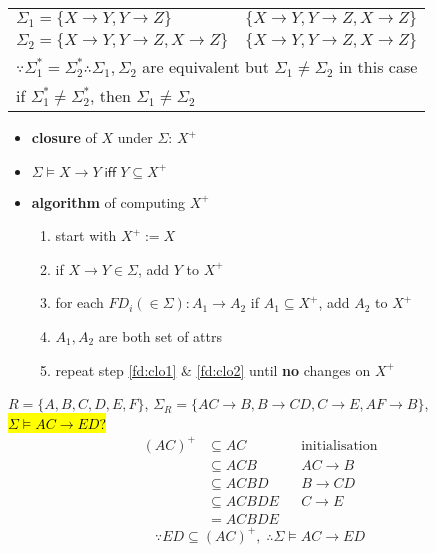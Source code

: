 \begin{minipage}{\linewidth}
  \centering
  \begin{tabular}{l|c}
    \hline
    $\Sigma_{1} = \{ X \rightarrow Y, Y \rightarrow Z\}$ & $\{ X \rightarrow Y, Y \rightarrow Z, X \rightarrow Z\}$\\
    $\Sigma_{2} = \{ X \rightarrow Y, Y \rightarrow Z, X \rightarrow Z\}$ & $\{ X \rightarrow Y, Y \rightarrow Z, X \rightarrow Z\}$ \\
    \hline
    \multicolumn{2}{l}{$\because \Sigma^{*}_{1} = \Sigma^{*}_{2} \therefore \Sigma_{1}, \Sigma_{2}$ are equivalent but $\Sigma_{1} \neq \Sigma_{2}$ in this case}\\
    \multicolumn{2}{l}{if $\Sigma^{*}_{1} \neq \Sigma^{*}_{2}$, then $\Sigma_{1} \neq \Sigma_{2}$}\\
    \hline
\end{tabular}
\end{minipage}
\begin{minipage}{0.5\linewidth}
\begin{itemize}
\item \textbf{closure} of $X$ under $\Sigma$: $X^{+}$
\item $\Sigma \models X \rightarrow Y\; \mathsf{iff} \;Y \subseteq X^{+}$
\item \textbf{algorithm} of computing $X^{+}$
  \begin{enumerate}[leftmargin=0.5em]
  \item start with $X^{+} := X$
  \item\label{fd:clo1} if $X \rightarrow Y \in \Sigma$, add $Y$ to $X^{+}$
  \item\label{fd:clo2} for each $FD_{i}(\in \Sigma): A_{1} \rightarrow A_{2} $ if $A_{1} \subseteq X^{+}$, add $A_{2}$ to $X^{+}$
  \item[] $A_{1},A_{2}$ are both set of attrs
  \item repeat step \ref{fd:clo1} \& \ref{fd:clo2} until \textbf{no} changes on $X^{+}$
  \end{enumerate}
\end{itemize}
\end{minipage}
\begin{minipage}{0.5\linewidth}
$R = \{A,B,C,D,E,F\}$, $\Sigma_{R}=\{AC\rightarrow B,B\rightarrow CD, C \rightarrow E, AF \rightarrow B\}$, \hl{$\Sigma \models AC \rightarrow ED$?}
\begin{align*}
  (AC)^{+} & \subseteq AC && \text{initialisation}\\
           & \subseteq ACB && AC \rightarrow B\\
           & \subseteq ACBD && B \rightarrow CD\\
           & \subseteq ACBDE && C \rightarrow E\\
           & = ACBDE
\end{align*}
\[\because ED \subseteq (AC)^{+},\;\therefore \Sigma \models AC \rightarrow ED\]
\end{minipage}
